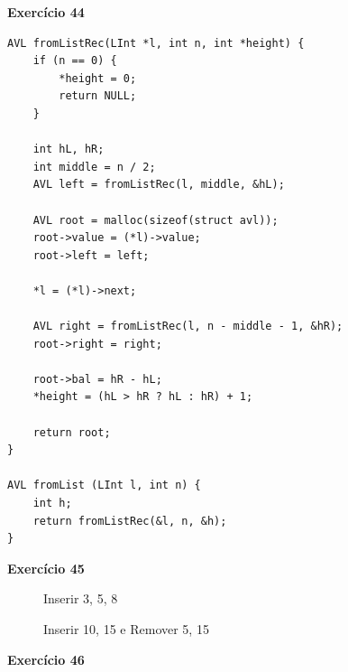 \documentclass[a4paper,11pt]{article}
\begin{document}
\noindent \textbf{Exercício 44}

\begin{verbatim}
AVL fromListRec(LInt *l, int n, int *height) {
	if (n == 0) {
		*height = 0;
		return NULL;
	}
	
	int hL, hR;
	int middle = n / 2;
	AVL left = fromListRec(l, middle, &hL);
	
	AVL root = malloc(sizeof(struct avl));
	root->value = (*l)->value;
	root->left = left;
	
	*l = (*l)->next;
	
	AVL right = fromListRec(l, n - middle - 1, &hR);
	root->right = right;
	
	root->bal = hR - hL;
	*height = (hL > hR ? hL : hR) + 1;
	
	return root;
}

AVL fromList (LInt l, int n) {
	int h;
	return fromListRec(&l, n, &h);
}
\end{verbatim}

\noindent \textbf{Exercício 45}

\begin{figure}[H]
	\centering
	\caption{Inserir 3, 5, 8}
\end{figure}

\begin{figure}[H]
	\centering
	\caption{Inserir 10, 15 e Remover 5, 15}
\end{figure}

\noindent \textbf{Exercício 46}
\end{document}
